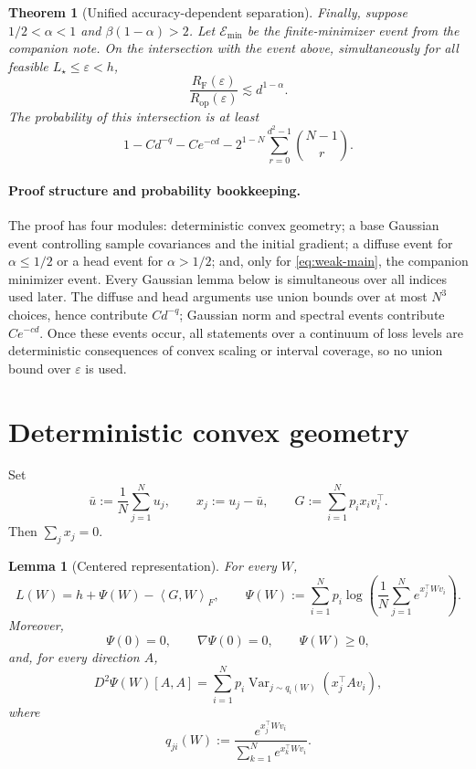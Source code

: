 \documentclass[11pt]{article}
\newtheorem{theorem}{Theorem}[section]
\newtheorem{lemma}[lemma]{Lemma}
\theoremstyle{definition}
\newcommand{\Var}{\operatorname{Var}}
\newcommand{\ip}[2]{\left\langle #1,#2\right\rangle_F}
\newcommand{\RF}{R_{\mathrm F}}
\newcommand{\Rop}{R_{\mathrm{op}}}
\newcommand{\eps}{\varepsilon}
\begin{document}
\begin{theorem}[Unified accuracy-dependent separation]
Finally, suppose $1/2<\alpha<1$ and $\beta(1-\alpha)>2$.  Let
$\mathcal E_{\min}$ be the finite-minimizer event from the companion
note.  On the intersection with the event above, simultaneously for all
feasible $L_\star\leq\eps<h$,
\begin{equation}
 \frac{\RF(\eps)}{\Rop(\eps)}\lesssim d^{1-\alpha}.
 \label{eq:weak-main}
\end{equation}
The probability of this intersection is at least
\begin{equation}
 1-Cd^{-q}-Ce^{-cd}
 -2^{1-N}\sum_{r=0}^{d^2-1}\binom{N-1}{r}.
 \label{eq:weak-main-prob}
\end{equation}
\end{theorem}

\paragraph{Proof structure and probability bookkeeping.}
The proof has four modules: deterministic convex geometry; a base
Gaussian event controlling sample covariances and the initial gradient;
a diffuse event for $\alpha\leq1/2$ or a head event for $\alpha>1/2$;
and, only for \eqref{eq:weak-main}, the companion minimizer event.
Every Gaussian lemma below is simultaneous over all indices used later.
The diffuse and head arguments use union bounds over at most $N^3$
choices, hence contribute $Cd^{-q}$; Gaussian norm and spectral events
contribute $Ce^{-cd}$.  Once these events occur, all statements over a
continuum of loss levels are deterministic consequences of convex
scaling or interval coverage, so no union bound over $\eps$ is used.

\section{Deterministic convex geometry}

Set
\[
 \bar u:=\frac1N\sum_{j=1}^N u_j,
 \qquad x_j:=u_j-\bar u,
 \qquad G:=\sum_{i=1}^N p_i x_i v_i^\top.
\]
Then $\sum_jx_j=0$.

\begin{lemma}[Centered representation]
\label{lem:centered}
For every $W$,
\begin{equation}
 L(W)=h+\Psi(W)-\ip{G}{W},
 \qquad
 \Psi(W):=\sum_{i=1}^N p_i
 \log\left(\frac1N\sum_{j=1}^N e^{x_j^\top Wv_i}\right).
 \label{eq:centered}
\end{equation}
Moreover,
\[
 \Psi(0)=0,\qquad \nabla\Psi(0)=0,\qquad \Psi(W)\geq0,
\]
and, for every direction $A$,
\begin{equation}
 D^2\Psi(W)[A,A]
 =\sum_{i=1}^N p_i
 \Var_{j\sim q_i(W)}(x_j^\top Av_i),
 \label{eq:hessian-variance}
\end{equation}
where
\[
 q_{ji}(W):=\frac{e^{x_j^\top Wv_i}}
 {\sum_{k=1}^N e^{x_k^\top Wv_i}}.
\]
\end{lemma}
\end{document}
